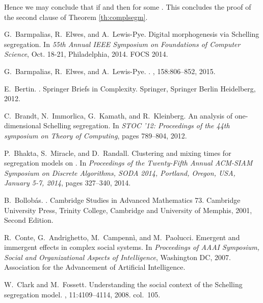 \documentclass[11pt]{article}
\theoremstyle{plain}
\numberwithin{equation}{subsection}
\begin{document}
Hence 
we may conclude that
if 
and  
then 
for some .
This concludes the proof of the second clause 
of Theorem \ref{th:complsegm}.
 




\newpage

\begin{thebibliography}{CMGP13}

G.~Barmpalias, R.~Elwes, and A.~Lewis-Pye.
\newblock Digital morphogenesis via {S}chelling segregation.
\newblock In {\em 55th Annual IEEE Symposium on Foundations of Computer
  Science}, Oct. 18-21, Philadelphia, 2014. FOCS 2014.

G.~Barmpalias, R.~Elwes, and A.~Lewis-Pye.
.
, 158:806--852, 2015.

E.~Bertin.
.
\newblock Springer Briefs in Complexity. Springer, Springer Berlin Heidelberg,
  2012.

C.~Brandt, N.~Immorlica, G.~Kamath, and R.~Kleinberg.
\newblock An analysis of one-dimensional {S}chelling segregation.
\newblock In {\em STOC '12: Proceedings of the 44th symposium on Theory of
  Computing}, pages 789--804, 2012.

P.~Bhakta, S.~Miracle, and D.~Randall.
\newblock Clustering and mixing times for segregation models on
  {}.
\newblock In {\em Proceedings of the Twenty-Fifth Annual {ACM-SIAM} Symposium
  on Discrete Algorithms, {SODA} 2014, Portland, Oregon, USA, January 5-7,
  2014}, pages 327--340, 2014.

B.~Bollob\'{a}s.
.
\newblock Cambridge Studies in Advanced Mathematics 73. Cambridge University
  Press, Trinity College, Cambridge and University of Memphis, 2001, Second
  Edition.

R.~Conte, G.~Andrighetto, M.~Campenn\`{i}, and M.~Paolucci.
\newblock Emergent and immergent effects in complex social systems.
\newblock In {\em Proceedings of AAAI Symposium, Social and Organizational
  Aspects of Intelligence}, Washington DC, 2007. Association for the
  Advancement of Artificial Intelligence.

W.\ Clark and M.\ Fossett.
\newblock Understanding the social context of the {S}chelling segregation
  model.
, 11:4109--4114,
  2008.
\newblock col.\ 105.


\end{thebibliography}
\end{document}
